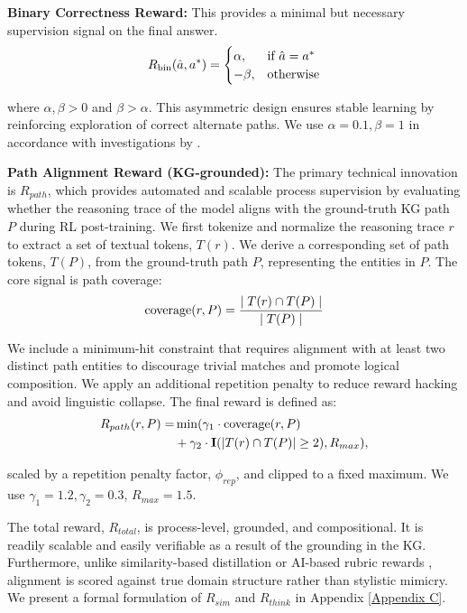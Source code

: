 \documentclass{article}
\theoremstyle{plain}
\theoremstyle{definition}
\theoremstyle{remark}
\begin{document}
\textbf{Binary Correctness Reward:} This provides a minimal but necessary supervision signal on the final answer.
\[
\vspace{-0.5em}
R_{\text{bin}}(\hat{a}, a^*) =
\begin{cases}
\alpha, & \text{if } \hat{a} = a^* \\
-\beta, & \text{otherwise}
\end{cases}
\vspace{-0.5em}
\]

where $\alpha, \beta > 0$ and $\beta > \alpha$. This asymmetric design ensures stable learning by reinforcing exploration of correct alternate paths. We use $\alpha = 0.1, \beta = 1$ in accordance with investigations by \citep{Zhu2025}.

\textbf{Path Alignment Reward (KG-grounded):} The primary technical innovation is $R_{path}$, which provides automated and scalable process supervision by evaluating whether the reasoning trace of the model aligns with the ground-truth KG path $P$ during RL post-training. We first tokenize and normalize the reasoning trace $r$ to extract a set of textual tokens, $T(r)$. We derive a corresponding set of path tokens, $T(P)$, from the ground-truth path $P$, representing the entities in $P$. The core signal is path coverage: 
\[
\vspace{-0.5em}
\text{coverage}(r, P) = \frac{\mid T(r)\cap T(P)\mid}{\mid T(P)\mid}
\vspace{-0.5em}
\]

We include a minimum-hit constraint that requires alignment with at least two distinct path entities to discourage trivial matches and promote logical composition. We apply an additional repetition penalty to reduce reward hacking and avoid linguistic collapse. The final reward is defined as:
\[
\vspace{-0.5em}
\begin{split}
R_{path}(r, P) = &\min(\gamma_1\cdot \text{coverage}(r, P) \\
&+ \gamma_2\cdot \mathbf{I}(|T(r)\cap T(P)|\geq 2), R_{max}),
\end{split}
\vspace{-0.5em}
\]

scaled by a repetition penalty factor, $\phi_{rep}$, and clipped to a fixed maximum. We use $\gamma_1 = 1.2, \gamma_2 = 0.3$, $R_{max} = 1.5$.

The total reward, $R_{total}$, is process-level, grounded, and compositional. It is readily scalable and easily verifiable as a result of the grounding in the KG. Furthermore, unlike similarity-based distillation or AI-based rubric rewards \cite{GunjalRubrics}, alignment is scored against true domain structure rather than stylistic mimicry. We present a formal formulation of $R_{sim}$ and $R_{think}$ in Appendix \ref{Appendix C}.
\end{document}
